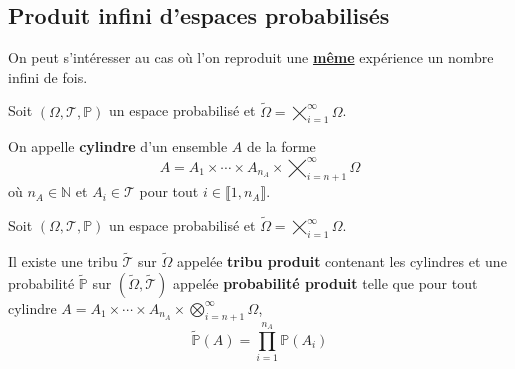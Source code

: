 \documentclass[a4paper,12pt]{article}
\begin{document}
\subsection{Produit infini d'espaces probabilisés}

On peut s'intéresser au cas où l'on reproduit une \underline{\textbf{même}} expérience un nombre infini de fois.

\begin{definition}
    Soit $(\Omega, \mathcal{T}, \mathbb{P})$ un espace probabilisé et $\tilde{\Omega} = \bigtimes\limits_{i=1}^\infty \Omega$.

    On appelle \textbf{cylindre} d'un ensemble $A$ de la forme
    $$
    A = A_1 \times \cdots \times A_{n_A} \times \bigtimes_{i=n+1}^\infty \Omega
    $$
    où $n_A \in \mathbb{N}$ et $A_i \in \mathcal{T}$ pour tout $i \in \llbracket 1, n_A \rrbracket$.
\end{definition}

\begin{theoreme}{}{}
    Soit $(\Omega, \mathcal{T}, \mathbb{P})$ un espace probabilisé et $\tilde{\Omega} = \bigtimes\limits_{i=1}^\infty \Omega$.

    Il existe une tribu $\tilde{\mathcal{T}}$ sur $\tilde{\Omega}$ appelée \textbf{tribu produit} contenant les cylindres et
    une probabilité $\tilde{\mathbb{P}}$ sur $(\tilde{\Omega}, \tilde{\mathcal{T}})$ appelée \textbf{probabilité produit} telle que pour tout cylindre $A = A_1 \times \cdots \times A_{n_A} \times \bigotimes_{i=n+1}^\infty \Omega$,
    $$
    \tilde{\mathbb{P}}(A) = \prod_{i=1}^{n_A} \mathbb{P}(A_i)
    $$
\end{theoreme}
\end{document}

